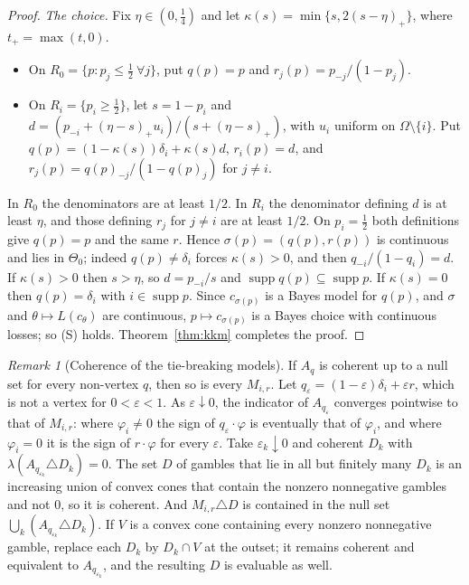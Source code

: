 \documentclass[11pt]{article}
\theoremstyle{definition}
\theoremstyle{remark}
\newtheorem{remark}[theorem]{Remark}
\newcommand{\supp}{\operatorname{supp}}
\begin{document}
\begin{proof}
\emph{The choice.} Fix $\eta\in(0,\tfrac14)$ and let $\kappa(s)=\min\{s,2(s-\eta)_+\}$, where $t_+=\max(t,0)$.
\begin{itemize}
\item On $R_0=\{p:p_j\le\tfrac12\ \forall j\}$, put $q(p)=p$ and $r_j(p)=p_{-j}/(1-p_j)$.
\item On $R_i=\{p_i\ge\tfrac12\}$, let $s=1-p_i$ and $d=(p_{-i}+(\eta-s)_+u_i)/(s+(\eta-s)_+)$, with $u_i$ uniform on $\Omega\setminus\{i\}$. Put $q(p)=(1-\kappa(s))\delta_i+\kappa(s)d$, $r_i(p)=d$, and $r_j(p)=q(p)_{-j}/(1-q(p)_j)$ for $j\ne i$.
\end{itemize}
In $R_0$ the denominators are at least $1/2$. In $R_i$ the denominator defining $d$ is at least $\eta$, and those defining $r_j$ for $j\ne i$ are at least $1/2$. On $p_i=\tfrac12$ both definitions give $q(p)=p$ and the same $r$. Hence $\sigma(p)=(q(p),r(p))$ is continuous and lies in $\Theta_0$; indeed $q(p)\ne\delta_i$ forces $\kappa(s)>0$, and then $q_{-i}/(1-q_i)=d$. If $\kappa(s)>0$ then $s>\eta$, so $d=p_{-i}/s$ and $\supp q(p)\subseteq\supp p$. If $\kappa(s)=0$ then $q(p)=\delta_i$ with $i\in\supp p$. Since $c_{\sigma(p)}$ is a Bayes model for $q(p)$, and $\sigma$ and $\theta\mapsto L(c_\theta)$ are continuous, $p\mapsto c_{\sigma(p)}$ is a Bayes choice with continuous losses; so (S) holds. Theorem~\ref{thm:kkm} completes the proof.
\end{proof}
\begin{remark}[Coherence of the tie-breaking models]\label{rem:tiecoh}
If $A_q$ is coherent up to a null set for every non-vertex $q$, then so is every $M_{i,r}$. Let $q_\varepsilon=(1-\varepsilon)\delta_i+\varepsilon r$, which is not a vertex for $0<\varepsilon<1$. As $\varepsilon\downarrow0$, the indicator of $A_{q_\varepsilon}$ converges pointwise to that of $M_{i,r}$: where $\varphi_i\ne0$ the sign of $q_\varepsilon\cdot\varphi$ is eventually that of $\varphi_i$, and where $\varphi_i=0$ it is the sign of $r\cdot\varphi$ for every $\varepsilon$. Take $\varepsilon_k\downarrow0$ and coherent $D_k$ with $\lambda(A_{q_{\varepsilon_k}}\triangle D_k)=0$. The set $D$ of gambles that lie in all but finitely many $D_k$ is an increasing union of convex cones that contain the nonzero nonnegative gambles and not $0$, so it is coherent. And $M_{i,r}\triangle D$ is contained in the null set $\bigcup_k(A_{q_{\varepsilon_k}}\triangle D_k)$. If $V$ is a convex cone containing every nonzero nonnegative gamble, replace each $D_k$ by $D_k\cap V$ at the outset; it remains coherent and equivalent to $A_{q_{\varepsilon_k}}$, and the resulting $D$ is evaluable as well.
\end{remark}
\end{document}

